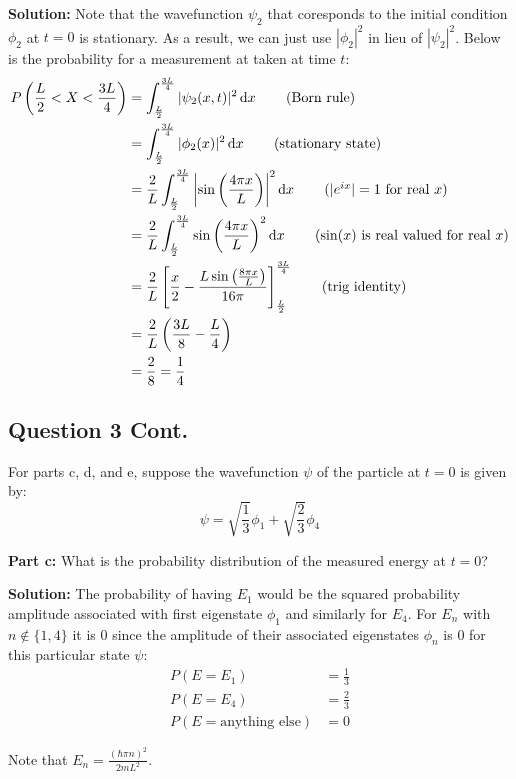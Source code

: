 \documentclass{article}
\renewcommand{\eval}[3]{\left[#1\right]_{#2}^{#3}}
\begin{document}
\noindent\textbf{Solution:} Note that the wavefunction $\psi_2$ that coresponds to the initial condition $\phi_2$ at $t=0$ is stationary. As a result, we can just use $|\phi_2|^2$ in lieu of $|\psi_2|^2$. Below is the probability for a measurement at taken at time $t$:
\begin{align*}
    P\left(\frac{L}{2}<X<\frac{3L}{4}\right)&=\int_\frac{L}{2}^\frac{3L}{4}|\psi_2(x,t)|^2\dd{x}\tag{Born rule}\\
    &=\int_\frac{L}{2}^\frac{3L}{4}|\phi_2(x)|^2\dd{x}\tag{stationary state}\\
    &=\frac{2}{L}\int_\frac{L}{2}^\frac{3L}{4}\left|\sin\left(\frac{4\pi x}{L}\right)\right|^2\dd{x}\tag{$|e^{ix}|=1$ for real $x$}\\
    &=\frac{2}{L}\int_\frac{L}{2}^\frac{3L}{4}\sin\left(\frac{4\pi x}{L}\right)^2\dd{x}\tag{$\sin(x)$ is real valued for real $x$}\\
    &=\frac{2}{L}\eval{\frac{x}{2}-\frac{L\sin\left(\frac{8\pi x}{L}\right)}{16\pi}}{\frac{L}{2}}{\frac{3L}{4}}\tag{trig identity}\\
    &=\frac{2}{L}\left(\frac{3L}{8}-\frac{L}{4}\right)\\
    &=\frac{2}{8}=\frac{1}{4}
\end{align*}
\bigskip

\subsection*{Question 3 Cont.}
For parts c, d, and e, suppose the wavefunction $\psi$ of the particle at $t=0$ is given by:
$$\psi=\sqrt{\frac{1}{3}}\phi_1+\sqrt{\frac{2}{3}}\phi_4$$
\bigskip

\noindent\textbf{Part c:} What is the probability distribution of the measured energy at $t=0$?
\bigskip

\noindent\textbf{Solution:} The probability of having $E_1$ would be the squared probability amplitude associated with first eigenstate $\phi_1$ and similarly for $E_4$. For $E_n$ with $n\not\in\{1,4\}$ it is 0 since the amplitude of their associated eigenstates $\phi_n$ is 0 for this particular state $\psi$:
\begin{align*}
    P(E=E_1)&=\frac{1}{3}\\
    P(E=E_4)&=\frac{2}{3}\\
    P(E=\text{anything else})&=0
\end{align*}

Note that $E_n=\frac{(\hbar\pi n)^2}{2mL^2}$.
\bigskip
\newpage
\end{document}
